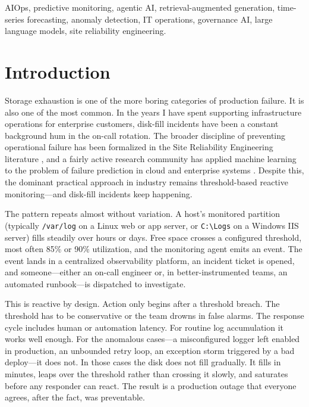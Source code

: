 \documentclass[conference]{IEEEtran}
\begin{document}
\begin{IEEEkeywords}
AIOps, predictive monitoring, agentic AI, retrieval-augmented
generation, time-series forecasting, anomaly detection, IT operations,
governance AI, large language models, site reliability engineering.
\end{IEEEkeywords}

\section{Introduction}

Storage exhaustion is one of the more boring categories of production
failure. It is also one of the most common. In the years I have spent
supporting infrastructure operations for enterprise customers,
disk-fill incidents have been a constant background hum in the
on-call rotation. The broader discipline of preventing operational
failure has been formalized in the Site Reliability Engineering
literature \cite{beyer2016sre}, and a fairly active research community
has applied machine learning to the problem of failure prediction in
cloud and enterprise systems \cite{notaro2021aiops,salfner2010survey,
lin2018predicting}. Despite this, the dominant practical approach in
industry remains threshold-based reactive monitoring---and disk-fill
incidents keep happening.

The pattern repeats almost without variation. A host's monitored
partition (typically \texttt{/var/log} on a Linux web or app server,
or \texttt{C:\textbackslash Logs} on a Windows IIS server) fills
steadily over hours or days. Free space crosses a configured
threshold, most often 85\% or 90\% utilization, and the monitoring
agent emits an event. The event lands in a centralized observability
platform, an incident ticket is opened, and someone---either an
on-call engineer or, in better-instrumented teams, an automated
runbook---is dispatched to investigate.

This is reactive by design. Action only begins after a threshold
breach. The threshold has to be conservative or the team drowns in
false alarms. The response cycle includes human or automation
latency. For routine log accumulation it works well enough. For the
anomalous cases---a misconfigured logger left enabled in production,
an unbounded retry loop, an exception storm triggered by a bad
deploy---it does not. In those cases the disk does not fill
gradually. It fills in minutes, leaps over the threshold rather than
crossing it slowly, and saturates before any responder can react.
The result is a production outage that everyone agrees, after the
fact, was preventable.
\end{document}
